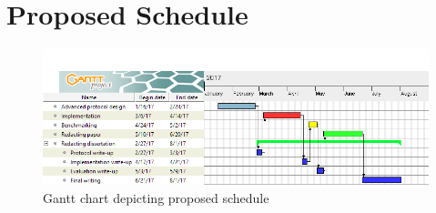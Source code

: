 \documentclass[runningheads,a4paper]{llncs}
\begin{document}



\newpage
\appendix

\section{Proposed Schedule} \label{Schedule}

\begin{figure}[h]
	\includegraphics[width=\textwidth,height=\textheight,keepaspectratio]{Proposal}
	\caption{Gantt chart depicting proposed schedule}
	\label{fig:proposal}
	\centering
\end{figure}
\end{document}
